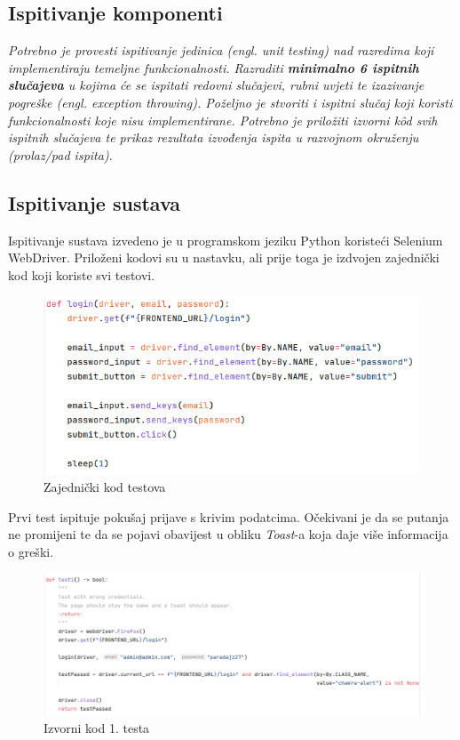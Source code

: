 			
			\subsection{Ispitivanje komponenti}
			\textit{Potrebno je provesti ispitivanje jedinica (engl. unit testing) nad razredima koji implementiraju temeljne funkcionalnosti. Razraditi \textbf{minimalno 6 ispitnih slučajeva} u kojima će se ispitati redovni slučajevi, rubni uvjeti te izazivanje pogreške (engl. exception throwing). Poželjno je stvoriti i ispitni slučaj koji koristi funkcionalnosti koje nisu implementirane. Potrebno je priložiti izvorni kôd svih ispitnih slučajeva te prikaz rezultata izvođenja ispita u razvojnom okruženju (prolaz/pad ispita). }
			
			
			
			\subsection{Ispitivanje sustava}
			
			Ispitivanje sustava izvedeno je u programskom jeziku Python koristeći Selenium WebDriver. Priloženi kodovi su u nastavku, ali prije toga je izdvojen zajednički kod koji koriste svi testovi.
			
			\begin{figure}[H]
				\includegraphics[width=\textwidth]{slike/selenium_common.png}
				\centering
				\caption{Zajednički kod testova}
				\label{fig:zajednicki-kod-testova}
			\end{figure}
			
			Prvi test ispituje pokušaj prijave s krivim podatcima. Očekivani je da se putanja ne promijeni te da se pojavi obavijest u obliku \textit{Toast}-a koja daje više informacija o greški.   
			
			\begin{figure}[H]
				\includegraphics[width=\textwidth]{slike/selenium_test1.png}
				\centering
				\caption{Izvorni kod 1. testa}
				\label{fig:izvorni-kod-testa-1}
			\end{figure}
		

